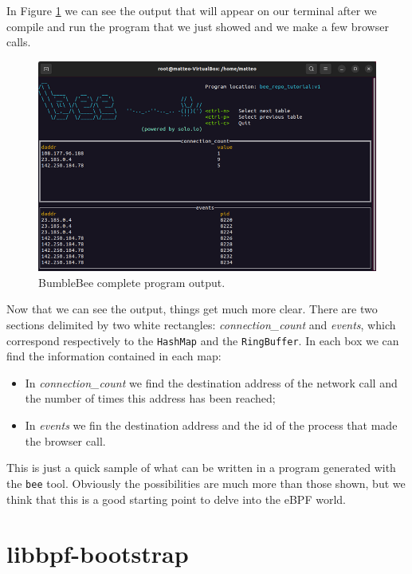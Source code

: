 In Figure \ref{fig:bee_compelte_program_output} we can see the output that will appear on our terminal after we compile and run the program that we just showed and we make a few browser calls.

\begin{figure}[h]
	\centering
	\includegraphics[width=0.7\linewidth]{images/LinuxDevelopment/bee_repo_tut_display.png}
	\caption{BumbleBee complete program output.}
	\label{fig:bee_compelte_program_output}
\end{figure}

Now that we can see the output, things get much more clear.
There are two sections delimited by two white rectangles: \textit{connection\_count} and \textit{events}, which correspond respectively to the \colorbox{backcolour}{\lstinline[style=highlight, language=bash]|HashMap|} and the \colorbox{backcolour}{\lstinline[style=highlight, language=bash]|RingBuffer|}.
In each box we can find the information contained in each map:

\begin{itemize}
	\item 
		In \textit{connection\_count} we find the destination address of the network call and the number of times this address has been reached;
	\item 
		In \textit{events} we fin the destination address and the id of the process that made the browser call.
\end{itemize}

This is just a quick sample of what can be written in a program generated with the \colorbox{backcolour}{\lstinline[style=highlight, language=bash]|bee|} tool.
Obviously the possibilities are much more than those shown, but we think that this is a good starting point to delve into the eBPF world.

\section{libbpf-bootstrap}

